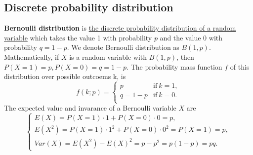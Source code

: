 \documentclass[10pt,onecolumn]{book}
\begin{document}
\subsection{Discrete probability distribution}
\textbf{Bernoulli distribution} is \uline{the discrete probability distribution of a random variable} which takes the value 1 with probability $p$ and the value 0 with probability $q=1-p$. We denote Bernoulli distribution as $B(1, p)$. Mathematically, if $X$ is a random variable with $B(1, p)$, then $P(X=1)=p, P(X=0)=q=1-p$. The probability mass function $f$ of this distribution over possible outcoems k, is 
\begin{equation}
f(k;p) = 
\left\{
	\begin{array}{lr}
	p         & \mathrm{if} \ k = 1,\\
	q = 1 - p & \mathrm{if} \ k = 0. \\
	\end{array}
\right.
\end{equation}
The expected value and invarance  of a Bernoulli variable $X$ are
\begin{equation}\label{eq:bernoulli_distribution_e_var}
\left\{
	\begin{array}{lr}
	E(X) = P(X = 1) \cdot 1 + P(X = 0) \cdot 0 = p, \\
	E(X^2) = P(X = 1) \cdot 1^2 + P(X = 0) \cdot 0^2 = P(X = 1) = p, \\ 
	Var(X) = E(X^2) - E(X)^2 = p - p^2 = p(1 - p) = pq.
	\end{array}
\right.
\end{equation}
\end{document}
